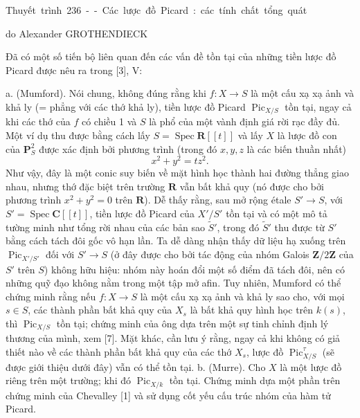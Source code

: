 \unit{Thuyết trình 236 -- Các lược đồ Picard: các tính chất tổng quát}
%
  {do Alexander GROTHENDIECK}


Đã có một số tiến bộ liên quan đến các vấn đề tồn tại của những tiền lược đồ
Picard được nêu ra trong [3], V:

\medskip
\noindent a. (Mumford). Nói chung, không đúng rằng khi
$f:X\longrightarrow S$ là một cấu xạ xạ ảnh và khả ly (= phẳng với các thớ
khả ly), tiền lược đồ Picard $\operatorname{Pic}_{X/S}$ tồn tại, ngay cả khi
các thớ của $f$ có chiều 1 và $S$ là phổ của một vành định giá rời rạc đầy đủ.
Một ví dụ thu được bằng cách lấy $S=\operatorname{Spec}\mathbf R[[t]]$ và lấy
$X$ là lược đồ con của $\mathbf P^2_S$ được xác định bởi phương trình (trong đó
$x,y,z$ là các biến thuần nhất)
\[
x^2+y^2=tz^2.
\]
Như vậy, đây là một conic suy biến về mặt hình học thành hai đường thẳng giao
nhau, nhưng thớ đặc biệt trên trường $\mathbf R$ vẫn bất khả quy (nó được cho
bởi phương trình $x^2+y^2=0$ trên $\mathbf R$). Dễ thấy rằng, sau mở rộng étale
$S'\longrightarrow S$, với $S'=\operatorname{Spec}\mathbf C[[t]]$, tiền lược
đồ Picard của $X'/S'$ tồn tại và có một mô tả tường minh như tổng rời nhau của
các bản sao $\widetilde S'$, trong đó $\widetilde S'$ thu được từ $S'$ bằng
cách tách đôi gốc vô hạn lần. Ta dễ dàng nhận thấy dữ liệu hạ xuống trên
$\operatorname{Pic}_{X'/S'}$ đối với $S'\longrightarrow S$ (ở đây được cho
bởi tác động của nhóm Galois $\mathbf Z/2\mathbf Z$ của $S'$ trên $S$) không
hữu hiệu: nhóm này hoán đổi một số điểm đã tách đôi, nên có những quỹ đạo không
nằm trong một tập mở afin. Tuy nhiên, Mumford có thể chứng minh rằng nếu
$f:X\longrightarrow S$ là một cấu xạ xạ ảnh và khả ly sao cho, với mọi
$s\in S$, các thành phần bất khả quy của $X_s$ là bất khả quy hình học trên
$k(s)$, thì $\operatorname{Pic}_{X/S}$ tồn tại; chứng minh của ông dựa trên
một sự tinh chỉnh định lý thương của mình, xem [7]. Mặt khác, cần lưu ý rằng,
ngay cả khi không có giả thiết nào về các thành phần bất khả quy của các thớ
$X_s$, lược đồ $\operatorname{Pic}^{\tau}_{X/S}$ (sẽ được giới thiệu dưới
đây) vẫn có thể tồn tại.
\noindent b. (Murre). Cho $X$ là một lược đồ riêng trên một trường; khi đó
$\operatorname{Pic}_{X/k}$ tồn tại. Chứng minh dựa một phần trên chứng minh
của Chevalley [1] và sử dụng cốt yếu cấu trúc nhóm của hàm tử Picard.


